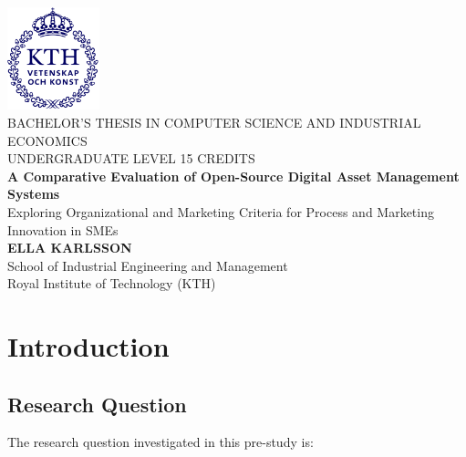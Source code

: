 \documentclass[a4paper,12pt,twocolumn]{article}
\begin{document}
\clearpage
\thispagestyle{empty}  %

\setlength{\headheight}{14.5pt}
\begin{titlepage}
    \centering
    \includegraphics[width=0.2\textwidth]{kthLogga.png}\\[1cm]
    {\large BACHELOR'S THESIS IN COMPUTER SCIENCE AND INDUSTRIAL ECONOMICS}\\[0.5cm]
    {\large UNDERGRADUATE LEVEL 15 CREDITS}\\[3cm]
    {\Huge \textbf{A Comparative Evaluation of Open-Source Digital Asset Management Systems}}\\[0.5cm]
    {\Large Exploring Organizational and Marketing Criteria for Process and Marketing Innovation in SMEs}\\[1cm]
    \vfill
    {\Large \textbf{ELLA KARLSSON}}\\[1cm]
    \vfill
    {\large School of Industrial Engineering and Management}\\
    {\large Royal Institute of Technology (KTH)}\\
\end{titlepage}

\newpage
\onecolumn
\tableofcontents
\newpage

\twocolumn
{}

\RaggedRight   %
\sloppy        %

\section{Introduction}
\subsection{Research Question}
The research question investigated in this pre-study is:
\end{document}

